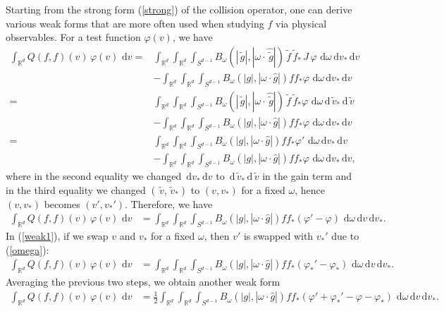 \documentclass[review, times]{elsarticle}
\newcommand{\rd}{\,\mathrm{d}}
\newcommand{\tv}{\,\tilde{v}}
\newcommand{\tg}{\,\tilde{g}}
\newcommand{\tf}{\,\tilde{f}}
\begin{document}
Starting from the strong form (\ref{strong}) of the collision operator, one can derive various weak forms that are more often used when studying $f$ via physical observables. For a test function $\varphi(v)$, we have
\begin{align}
\int_{\mathbb{R}^d} Q(f,f)(v)\,\varphi(v)\,\rd{v}=&\int_{\mathbb{R}^d}\int_{\mathbb{R}^d}\int_{S^{d-1}}B_{\omega}(|\tg|,|\omega\cdot \hat{\tg}|)\tf \tf_* \,J\,\varphi\,\rd{\omega}\rd{v_*}\rd{v}\nonumber\\
&  -\int_{\mathbb{R}^d}\int_{\mathbb{R}^d}\int_{S^{d-1}}B_{\omega}(|g|,|\omega\cdot \hat{g}|)ff_*\varphi\,\rd{\omega}\rd{v_*}\rd{v}\nonumber\\
=&\int_{\mathbb{R}^d}\int_{\mathbb{R}^d}\int_{S^{d-1}}B_{\omega}(|\tg|,|\omega\cdot \hat{\tg}|)\tf \tf_* \varphi\,\rd{\omega}\rd{\tv_*}\rd{\tv}\nonumber\\
& -\int_{\mathbb{R}^d}\int_{\mathbb{R}^d}\int_{S^{d-1}}B_{\omega}(|g|,|\omega\cdot \hat{g}|)ff_*\varphi\,\rd{\omega}\rd{v_*}\rd{v}\nonumber\\
=&\int_{\mathbb{R}^d}\int_{\mathbb{R}^d}\int_{S^{d-1}}B_{\omega}(|g|,|\omega\cdot \hat{g}|)ff_* \varphi'\,\rd{\omega}\rd{v_*}\rd{v}\nonumber\\
& -\int_{\mathbb{R}^d}\int_{\mathbb{R}^d}\int_{S^{d-1}}B_{\omega}(|g|,|\omega\cdot \hat{g}|)ff_*\varphi\,\rd{\omega}\rd{v_*}\rd{v},
\end{align}
where in the second equality we changed $\rd{v_*}\rd{v}$ to $\rd{\tv_*}\rd{\tv}$ in the gain term and in the third equality we changed $(\tv,\tv_*)$ to $(v,v_*)$ for a fixed $\omega$, hence $(v,v_*)$ becomes $(v',v_*')$. Therefore, we have
\begin{align} \label{weak1}
\int_{\mathbb{R}^d} Q(f,f)(v)\,\varphi(v)\,\rd{v}&= \int_{\mathbb{R}^d} \int_{\mathbb{R}^d} \int_{S^{d-1}} B_{\omega}(|g|,|\omega\cdot \hat{g}|)ff_*  \left(\varphi'-\varphi\right)\,\rd{\omega} \rd{v} \rd{v_*}.
\end{align}
In (\ref{weak1}), if we swap $v$ and $v_*$ for a fixed $\omega$, then $v'$ is swapped with $v_*'$ due to (\ref{omega}):
\begin{align}
\int_{\mathbb{R}^d} Q(f,f)(v)\,\varphi(v)\,\rd{v}&= \int_{\mathbb{R}^d} \int_{\mathbb{R}^d} \int_{S^{d-1}} B_{\omega}(|g|,|\omega\cdot \hat{g}|)ff_*  \left(\varphi_*'-\varphi_*\right)\,\rd{\omega} \rd{v} \rd{v_*}.
\end{align}
Averaging the previous two steps, we obtain another weak form
\begin{align} \label{weak2}
\int_{\mathbb{R}^d} Q(f,f)(v)\,\varphi(v)\,\rd{v}&=\frac{1}{2} \int_{\mathbb{R}^d} \int_{\mathbb{R}^d} \int_{S^{d-1}} B_{\omega}(|g|,|\omega\cdot \hat{g}|)ff_* \left(\varphi'+\varphi_*'-\varphi-\varphi_* \right)\,\rd{\omega}\rd{v} \rd{v_*}.
\end{align}
\end{document}
